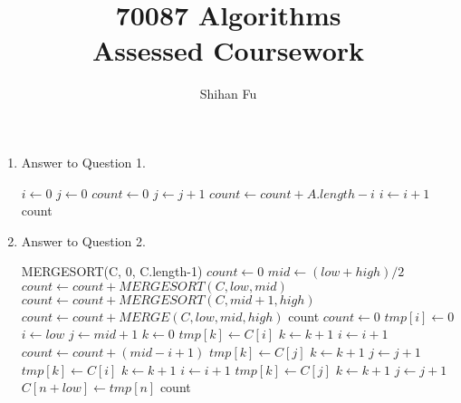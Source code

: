 \documentclass{article}
\title{
  70087 Algorithms \\
  Assessed Coursework
}
\author{Shihan Fu}
\begin{document}
\maketitle

\begin{enumerate}
  \item Answer to Question 1.
    \begin{algorithmic}[1]
      \Statex
        \State $i \gets 0$
        \State $j \gets 0$
        \State $count \gets 0$
            \State $j \gets j+1$
            \State $count \gets count + A.length - i$
          \Else
            \State $i \gets i+1$
          \EndIf
        \EndWhile
        \State \Return count
      \EndProcedure
    \end{algorithmic}
  \item Answer to Question 2.
  \begin{algorithmic}[1]
    \Statex
      \State \Return MERGESORT(C, 0, C.length-1)
    \EndProcedure
      \State $count \gets 0$
      \State $mid \gets (low+high)/2$
        \State $count \gets count + MERGESORT(C, low, mid)$
        \State $count \gets count + MERGESORT(C, mid + 1, high)$
        \State $count \gets count + MERGE(C, low, mid, high)$
      \EndIf
      \State \Return count
    \EndProcedure
      \State $count \gets 0$
        \State $tmp[i] \gets 0$
      \EndFor
      \State $i \gets low$
      \State $j \gets mid + 1$
      \State $k \gets 0$
          \State $tmp[k] \gets C[i]$
          \State $k \gets k + 1$
          \State $i \gets i + 1$
        \Else
          \State $count \gets count + (mid - i + 1)$
          \State $tmp[k] \gets C[j]$
          \State $k \gets k + 1$
          \State $j \gets j + 1$
        \EndIf
      \EndWhile
        \State $tmp[k] \gets C[i]$
        \State $k \gets k + 1$
        \State $i \gets i + 1$
      \EndWhile
        \State $tmp[k] \gets C[j]$
        \State $k \gets k + 1$
        \State $j \gets j + 1$
      \EndWhile
        \State $C[n + low] \gets tmp[n]$
      \EndFor
      \State \Return count
    \EndProcedure
  \end{algorithmic}

\end{enumerate}
\end{document}
